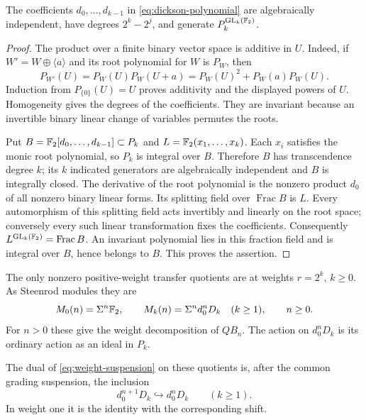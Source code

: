 \begin{lemma}\label{lem:dickson-ring}
The coefficients \(d_0,\ldots,d_{k-1}\) in
\eqref{eq:dickson-polynomial} are algebraically independent, have
degrees \(2^k-2^j\), and generate
\(P_k^{\operatorname{GL}_k(\mathbb F_2)}\).
\end{lemma}

\begin{proof}
The product over a finite binary vector space is additive in \(U\).
Indeed, if \(W'=W\oplus\langle a\rangle\) and its root polynomial
for \(W\) is \(P_W\), then
\[
 P_{W'}(U)=P_W(U)P_W(U+a)
          =P_W(U)^2+P_W(a)P_W(U).
\]
Induction from \(P_{\{0\}}(U)=U\) proves additivity and the displayed
powers of \(U\). Homogeneity gives the degrees of the coefficients.
They are invariant because an invertible binary linear change of
variables permutes the roots.

Put \(B=\mathbb F_2[d_0,\ldots,d_{k-1}]\subset P_k\) and
\(L=\mathbb F_2(x_1,\ldots,x_k)\). Each \(x_i\) satisfies the monic
root polynomial, so \(P_k\) is integral over \(B\). Therefore
\(B\) has transcendence degree \(k\); its \(k\) indicated
generators are algebraically independent and \(B\) is integrally
closed. The derivative of the root polynomial is the nonzero product
\(d_0\) of all nonzero binary linear forms. Its splitting field
over \(\operatorname{Frac}B\) is \(L\). Every automorphism of
this splitting field acts invertibly and linearly on the root space;
conversely every such linear transformation fixes the coefficients.
Consequently \(L^{\operatorname{GL}_k(\mathbb F_2)}=\operatorname{Frac}B\).
An invariant polynomial lies in this fraction field and is integral
over \(B\), hence belongs to \(B\). This proves the assertion.
\end{proof}

\begin{lemma}\label{lem:weight-modules}
The only nonzero positive-weight transfer quotients are at weights
$r=2^k$, $k\geq0$. As Steenrod modules they are
\begin{equation}\label{eq:weight-modules}
 M_0(n)=\Sigma^n\mathbb F_2,\qquad
 M_k(n)=\Sigma^n d_0^nD_k\quad(k\geq1),\qquad n\geq0.
\end{equation}
For $n>0$ these give the weight decomposition of $QB_n$. The action on
$d_0^nD_k$ is its ordinary action as an ideal in $P_k$.

The dual of \eqref{eq:weight-suspension} on these quotients is, after
the common grading suspension, the inclusion
\begin{equation}\label{eq:module-suspension}
 d_0^{n+1}D_k\hookrightarrow d_0^nD_k
 \qquad(k\geq1).
\end{equation}
In weight one it is the identity with the corresponding shift.
\end{lemma}

